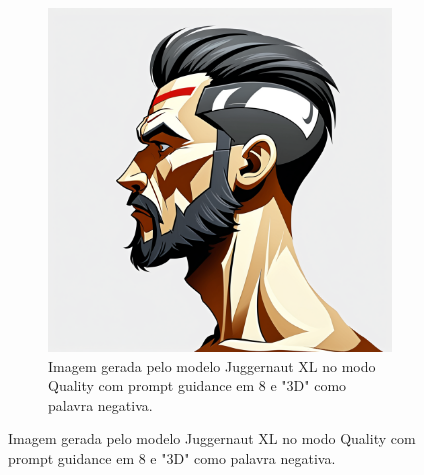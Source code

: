 \begin{figure}[htbp]
\begin{subfigure}{0.45\linewidth}
        \includegraphics[width=1\linewidth]{figs/cgDream/res_char_jug8.png}
        \caption{\small Imagem gerada pelo modelo Juggernaut XL no modo Quality com prompt guidance em 8 e "3D" como palavra negativa.}
        \label{fig:cgDream7c}
    \end{subfigure}
\end{figure}

